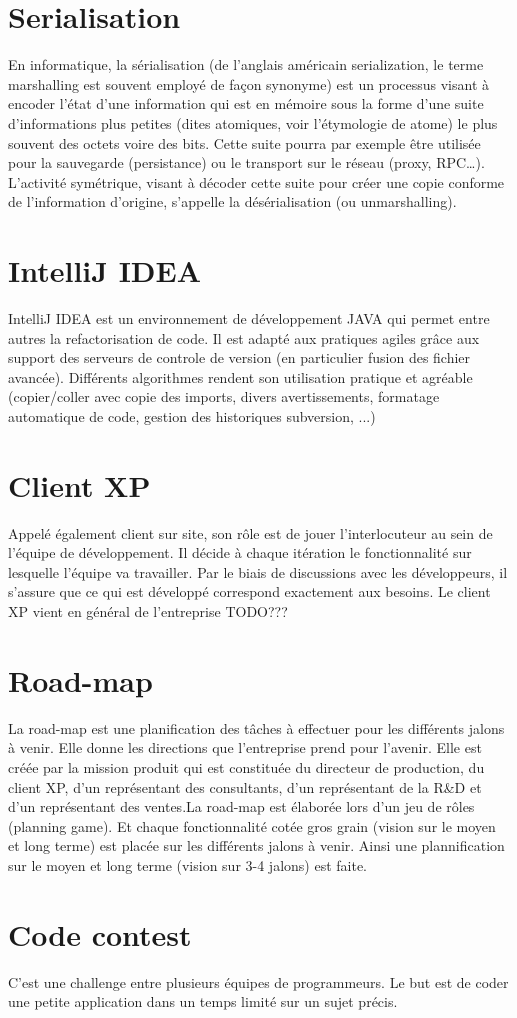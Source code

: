 \section{Serialisation}\label{lexique:serialisation}
En informatique, la sérialisation (de l'anglais américain serialization, le terme marshalling est souvent employé de façon synonyme) est un processus visant à encoder l'état d'une information qui est en mémoire sous la forme d'une suite d'informations plus petites (dites atomiques, voir l'étymologie de atome) le plus souvent des octets voire des bits. Cette suite pourra par exemple être utilisée pour la sauvegarde (persistance) ou le transport sur le réseau (proxy, RPC…). L'activité symétrique, visant à décoder cette suite pour créer une copie conforme de l'information d'origine, s'appelle la désérialisation (ou unmarshalling).

\section{IntelliJ IDEA}\label{lexique:IDEA}
IntelliJ IDEA est un environnement de développement JAVA qui permet entre autres la refactorisation de code. Il est adapté aux pratiques agiles grâce aux support des serveurs de controle de version (en particulier fusion des fichier avancée). Différents algorithmes rendent son utilisation pratique et agréable (copier/coller avec copie des imports, divers avertissements, formatage automatique de code, gestion des historiques subversion, ...)

\section{Client XP}\label{lexique:clientXP}
Appelé également client sur site, son rôle est de jouer l'interlocuteur au sein de l'équipe de développement. Il décide à chaque itération le fonctionnalité sur lesquelle l'équipe va travailler. Par le biais de discussions avec les développeurs, il s'assure que ce qui est développé correspond exactement aux besoins. Le client XP vient en général de l'entreprise TODO???

\section{Road-map}
La road-map est une planification des tâches à effectuer pour les différents jalons à venir. Elle donne les directions que l'entreprise prend pour l'avenir. Elle est créée par la mission produit qui est constituée du directeur de production, du client XP, d'un représentant des consultants, d'un représentant de la R\&D et d'un représentant des ventes.La road-map est élaborée lors d'un jeu de rôles (planning game). Et chaque fonctionnalité cotée gros grain (vision sur le moyen et long terme) est placée sur les différents jalons à venir. Ainsi une plannification sur le moyen et long terme (vision sur 3-4 jalons) est faite.

\section{Code contest}\label{lexique:codeContest}
C'est une challenge entre plusieurs équipes de programmeurs. Le but est de coder une petite application dans un temps limité sur un sujet précis. 

